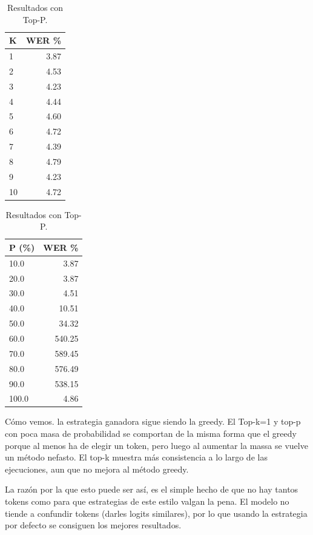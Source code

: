 \documentclass[11pt,spanish,listoffigures,listoftables]{tfgetsinf}
\begin{document}
\begin{table}[H]
\centering
\begin{minipage}[t]{0.48\textwidth}
\centering
\begin{tabular}{lr}
	\toprule
	\textbf{K} & \textbf{WER \%} \\
	\midrule
	1 & 3.87 \\
	2 & 4.53 \\
	3 & 4.23 \\
	4 & 4.44 \\
	5 & 4.60 \\
	6 & 4.72 \\
	7 & 4.39 \\
	8 & 4.79 \\
	9 & 4.23 \\
	10 & 4.72 \\
	\bottomrule
\end{tabular}
\caption{Resultados con Top-K.}
\label{tab:topk}
\end{minipage}
\hfill
\begin{minipage}[t]{0.48\textwidth}
\centering
\begin{tabular}{lr}
	\toprule
	\textbf{P (\%)} & \textbf{WER \%} \\
	\midrule
	10.0 & 3.87 \\
	20.0 & 3.87 \\
	30.0 & 4.51 \\
	40.0 & 10.51 \\
	50.0 & 34.32 \\
	60.0 & 540.25 \\
	70.0 & 589.45 \\
	80.0 & 576.49 \\
	90.0 & 538.15 \\
	100.0 & 4.86 \\
	\bottomrule
\end{tabular}
\caption{Resultados con Top-P.}
\label{tab:topp}
\end{minipage}
\end{table}



Cómo vemos. la estrategia ganadora sigue siendo la greedy. El Top-k=1 y top-p con poca masa de probabilidad se comportan de la misma forma que el greedy porque al menos ha de elegir un token, pero luego al aumentar la massa se vuelve un método nefasto. El top-k muestra más consistencia a lo largo de las ejecuciones, aun que no mejora al método greedy.

La razón por la que esto puede ser así, es el simple hecho de que no hay tantos tokens como para que estrategias de este estilo valgan la pena. El modelo no tiende a confundir tokens (darles logits similares), por lo que usando la estrategia por defecto se consiguen los mejores resultados.
\end{document}
